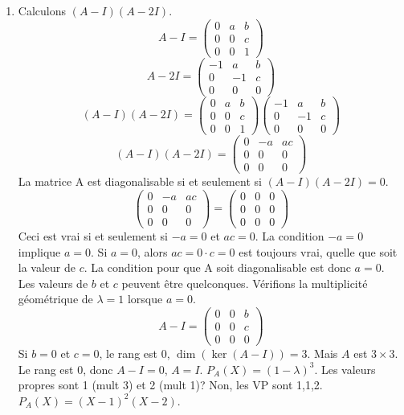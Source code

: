 \begin{solution}
\begin{enumerate}
    \item Calculons $(A-I)(A-2I)$.
    \[ A-I = \begin{pmatrix} 0 & a & b \\ 0 & 0 & c \\ 0 & 0 & 1 \end{pmatrix} \]
    \[ A-2I = \begin{pmatrix} -1 & a & b \\ 0 & -1 & c \\ 0 & 0 & 0 \end{pmatrix} \]
    \[ (A-I)(A-2I) = \begin{pmatrix} 0 & a & b \\ 0 & 0 & c \\ 0 & 0 & 1 \end{pmatrix} \begin{pmatrix} -1 & a & b \\ 0 & -1 & c \\ 0 & 0 & 0 \end{pmatrix} \]
    \[ (A-I)(A-2I) = \begin{pmatrix} 0 & -a & ac \\ 0 & 0 & 0 \\ 0 & 0 & 0 \end{pmatrix} \]
    La matrice A est diagonalisable si et seulement si $(A-I)(A-2I) = 0$.
    \[ \begin{pmatrix} 0 & -a & ac \\ 0 & 0 & 0 \\ 0 & 0 & 0 \end{pmatrix} = \begin{pmatrix} 0 & 0 & 0 \\ 0 & 0 & 0 \\ 0 & 0 & 0 \end{pmatrix} \]
    Ceci est vrai si et seulement si $-a = 0$ et $ac = 0$.
    La condition $-a=0$ implique $a=0$.
    Si $a=0$, alors $ac = 0 \cdot c = 0$ est toujours vrai, quelle que soit la valeur de $c$.
    La condition pour que A soit diagonalisable est donc $a=0$. Les valeurs de $b$ et $c$ peuvent être quelconques.
    Vérifions la multiplicité géométrique de $\lambda=1$ lorsque $a=0$.
    \[ A-I = \begin{pmatrix} 0 & 0 & b \\ 0 & 0 & c \\ 0 & 0 & 0 \end{pmatrix} \]
    Si $b=0$ et $c=0$, le rang est 0, $\dim(\ker(A-I))=3$. Mais $A$ est $3\times 3$. Le rang est 0, donc $A-I = 0$, $A=I$. $P_A(X)=(1-\lambda)^3$. Les valeurs propres sont 1 (mult 3) et 2 (mult 1)? Non, les VP sont 1,1,2. $P_A(X)=(X-1)^2(X-2)$.

\end{enumerate}
\end{solution}
